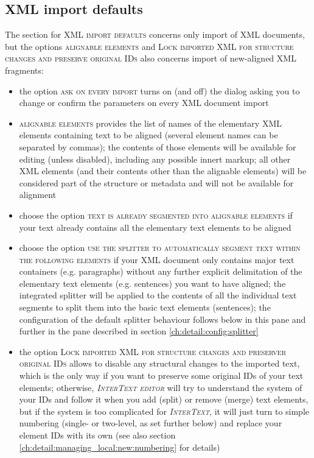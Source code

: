 \documentclass[a4paper,10pt,oneside]{book}
\newcommand{\IT}{\textit{\textsc{InterText}}\xspace}
\newcommand{\ITeditor}{\textit{\textsc{InterText editor}}\xspace}
\newcommand{\menu}[1]{\textsc{#1}}
\begin{document}
\subsection{XML import defaults}\label{ch:detail:config:import:xml}

The section for \menu{XML import defaults} concerns only import of XML documents, but the options \menu{alignable elements} and \menu{Lock imported XML for structure changes and preserve original IDs} also concerns import of new-aligned XML fragments:

\begin{itemize}
 \item the option \menu{ask on every import} turns on (and off) the dialog asking you to change or confirm the parameters on every XML document import
 \item \menu{alignable elements} provides the list of names of the elementary XML elements containing text to be aligned (several element names can be separated by commas); the contents of those elements will be available for editing (unless disabled), including any possible innert markup; all other XML elements (and their contents other than the alignable elements) will be considered part of the structure or metadata and will not be available for alignment
 \item choose the option \menu{text is already segmented into alignable elements} if your text already contains all the elementary text elements to be aligned
 \item choose the option \menu{use the splitter to automatically segment text within the following elements} if your XML document only contains major text containers (e.g. paragraphs) without any further explicit delimitation of the elementary text elements (e.g. sentences) you want to have aligned; the integrated splitter will be applied to the contents of all the individual text segments to split them into the basic text elements (sentences); the configuration of the default splitter behaviour follows below in this pane and further in the pane described in section \ref{ch:detail:config:splitter}
 \item the option \menu{Lock imported XML for structure changes and preserver original IDs} allows to disable any structural changes to the imported text, which is the only way if you want to preserve some original IDs of your text elements; otherwise, \ITeditor will try to understand the system of your IDs and follow it when you add (split) or remove (merge) text elements, but if the system is too complicated for \IT, it will just turn to simple numbering (single- or two-level, as set further below) and replace your element IDs with its own (see also section \ref{ch:detail:managing_local:new:numbering} for details)
\end{itemize}
\end{document}
